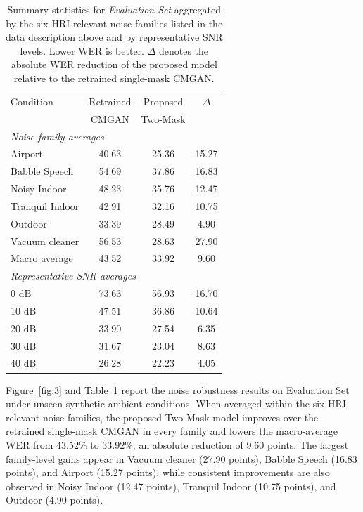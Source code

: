 \documentclass[manuscript,screen,review]{acmart}
\newcommand{\RomanNumeralCaps}[1]
    {\MakeUppercase{\romannumeral #1}}
\begin{document}
\begin{table}[ht]
\centering
\small
\caption{Summary statistics for \textit{Evaluation Set \RomanNumeralCaps{2}} aggregated by the six HRI-relevant noise families listed in the data description above and by representative SNR levels. Lower WER is better. $\Delta$ denotes the absolute WER reduction of the proposed model relative to the retrained single-mask CMGAN.}
\begin{tabular}{lccc}
\hline
Condition & Retrained & Proposed & $\Delta$ \\
 & CMGAN & Two-Mask &  \\ \hline
\multicolumn{4}{l}{\textit{Noise family averages}} \\
Airport & 40.63 & 25.36 & 15.27 \\
Babble Speech & 54.69 & 37.86 & 16.83 \\
Noisy Indoor & 48.23 & 35.76 & 12.47 \\
Tranquil Indoor & 42.91 & 32.16 & 10.75 \\
Outdoor & 33.39 & 28.49 & 4.90 \\
Vacuum cleaner & 56.53 & 28.63 & 27.90 \\
Macro average & 43.52 & 33.92 & 9.60 \\ \hline
\multicolumn{4}{l}{\textit{Representative SNR averages}} \\
0 dB & 73.63 & 56.93 & 16.70 \\
10 dB & 47.51 & 36.86 & 10.64 \\
20 dB & 33.90 & 27.54 & 6.35 \\
30 dB & 31.67 & 23.04 & 8.63 \\
40 dB & 26.28 & 22.23 & 4.05 \\ \hline
\end{tabular}
\label{tab:set2_summary}
\end{table}

Figure~\ref{fig:3} and Table~\ref{tab:set2_summary} report the noise robustness results on Evaluation Set~\RomanNumeralCaps{2} under unseen synthetic ambient conditions. When averaged within the six HRI-relevant noise families, the proposed Two-Mask model improves over the retrained single-mask CMGAN in every family and lowers the macro-average WER from 43.52\% to 33.92\%, an absolute reduction of 9.60 points. The largest family-level gains appear in Vacuum cleaner (27.90 points), Babble Speech (16.83 points), and Airport (15.27 points), while consistent improvements are also observed in Noisy Indoor (12.47 points), Tranquil Indoor (10.75 points), and Outdoor (4.90 points).
\end{document}
